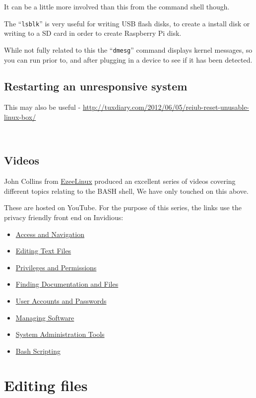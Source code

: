 \documentclass{book}
\newcommand\youtube[2]{\href{https://invidious.snopyta.org/watch?v=#1}{#2}}
\begin{document}
It can be a little more involved than this from the command shell though.

The ``\verb|lsblk|'' is very useful for writing USB flash disks, to create a install disk or writing to a SD card in order to create Raspberry Pi disk.

While not fully related to this the ``\verb|dmesg|'' command displays kernel messages, so you can run prior to, and after plugging in a device to see if it has been detected.

\subsection{Restarting an unresponsive system}

This may also be useful - \url{http://tuxdiary.com/2012/06/05/reiub-reset-unusable-linux-box/}

\



\subsection{Videos}

John Collins from \href{https://www.ezeelinux.com/}{EzeeLinux} produced an excellent series of videos covering different topics relating to the BASH shell, We have only touched on this above.

These are hosted on YouTube. For the purpose of this series, the links use the privacy friendly front end on Invidious:

\begin{itemize}
\item \youtube{eH8Z9zeywq0}{Access and Navigation}
\item \youtube{eH8Z9zeywq0}{Editing Text Files}
\item \youtube{s23NqWKxOXk}{Privileges and Permissions}
\item \youtube{4r7V2-EBnR0}{Finding Documentation and Files}
\item \youtube{XVCf0cou6EU}{User Accounts and Passwords}
\item \youtube{lNyJllHk2SA}{Managing Software}
\item \youtube{4\_21KZ3qKEI7}{System Administration Tools}
\item \youtube{57sp8Y0GL40}{Bash Scripting}
\end{itemize}


\section{Editing files}
\end{document}
